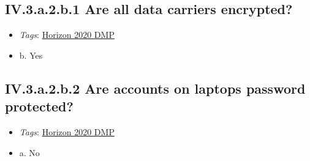 \documentclass[a4paper,12pt]{report}
\begin{document}
\subsection*{\protect\textcolor{colorSecId}{IV.3.a.2.b.1} Are all data carriers encrypted?}

\label{10a10ffd-bfe1-4c6b-bbb6-3dfb1e63a5d5.614ab69d-55a6-4214-b384-00ba21ce92a1.b2f76c0a-847a-403c-9ed6-09cad10e625e.abaf4a70-17d4-449c-9b95-5b3bcfed7e9b.c9fc7d94-0f37-40af-9d12-7c828d1252fc.6aff9a57-acea-4f6d-ac98-9a067e03cc8e}


\begin{itemize}
  \item \textit{Tags}: \ul{Horizon 2020 DMP}
  \end{itemize}




\begin{itemize}
  \item[\CheckmarkBold] b. Yes
\end{itemize}




\subsection*{\protect\textcolor{colorSecId}{IV.3.a.2.b.2} Are accounts on laptops password protected?}

\label{10a10ffd-bfe1-4c6b-bbb6-3dfb1e63a5d5.614ab69d-55a6-4214-b384-00ba21ce92a1.b2f76c0a-847a-403c-9ed6-09cad10e625e.abaf4a70-17d4-449c-9b95-5b3bcfed7e9b.c9fc7d94-0f37-40af-9d12-7c828d1252fc.26c19dc0-3e75-4ff6-a3b8-126ac54894aa}


\begin{itemize}
  \item \textit{Tags}: \ul{Horizon 2020 DMP}
  \end{itemize}




\begin{itemize}
  \item[\CheckmarkBold] a. No
\end{itemize}
\end{document}
